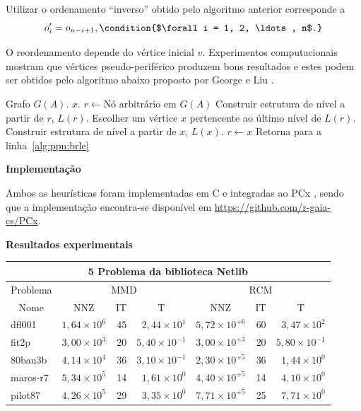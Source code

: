 \documentclass[]{beamer}
\begin{document}
\begin{frame}[t,fragile]
\begin{columns}[t]
\begin{column}{0.4\textwidth}
  Utilizar o ordenamento ``inverso'' obtido pelo algoritmo anterior corresponde
  a
  \begin{dmath*}
    o_i' = o_{n - i + 1}, \condition{$\forall i = 1, 2, \ldots, n$.}
  \end{dmath*}

  O reordenamento depende do vértice inicial $v$. Experimentos computacionais
  mostram que vértices pseudo-periférico produzem bons resultados e estes podem
  ser obtidos pelo algoritmo abaixo proposto por George e Liu
  \cite{George:1979:NodeFinder}.

  \begin{algorithmic}[1]
      \REQUIRE Grafo $G(A)$.
      \ENSURE $x$.
      \STATE $r \longleftarrow \text{Nó arbitrário em }G(A)$
      \STATE Construir estrutura de nível a partir de $r$, $L(r)$.
      \label{alg:ppn:brle}
      \STATE Escolher um vértice $x$ pertencente ao último nível de
      $L(r)$.
      \STATE Construir estrutura de nível a partir de $x$, $L(x)$.
          \STATE $r \longleftarrow x$
          \STATE Retorna para a linha~\ref{alg:ppn:brle}
      \ENDIF
  \end{algorithmic}

  \textbf{Implementação}

  Ambos as heurísticas foram implementadas em C e integradas ao PCx \cite{PCx},
  sendo que a implementação encontra-se disponível em
  \url{https://github.com/r-gaia-cs/PCx}.

  \textbf{Resultados experimentais}
  \begin{center}
\begin{tabular}{|l|r|r|r|r|r|r|}
\hline
\multicolumn{7}{|c|}{5 Problema da biblioteca Netlib} \\ \hline
\multicolumn{1}{|c|}{Problema} & \multicolumn{3}{|c|}{MMD} &         \multicolumn{3}{|c|}{RCM} \\ \hline
\multicolumn{1}{|c|}{Nome} &
        \multicolumn{1}{|c|}{NNZ} & \multicolumn{1}{|c|}{IT} &
        \multicolumn{1}{|c|}{T} &
        \multicolumn{1}{|c|}{NNZ} & \multicolumn{1}{|c|}{IT} &
        \multicolumn{1}{|c|}{T} \\ \hline
        dfl001       & $1,64 \times 10^{6}$ & 45 & $2,44 \times 10^{1}$  & $5,72 \times 10^{+6}$ & 60 & $3,47 \times 10^{2}$ \\ \hline
        fit2p        & $3,00 \times 10^{3}$ & 20 & $5,40 \times 10^{-1}$ & $3,00 \times 10^{+3}$ & 20 & $5,80 \times 10^{-1}$ \\ \hline
        80bau3b      & $4,14 \times 10^{4}$ & 36 & $3,10 \times 10^{-1}$ & $2,30 \times 10^{+5}$ & 36 & $1,44 \times 10^{0}$ \\ \hline
        maros-r7     & $5,34 \times 10^{5}$ & 14 & $1,61 \times 10^{0}$  & $4,40 \times 10^{+5}$ & 14 & $4,10 \times 10^{0}$ \\ \hline
        pilot87      & $4,26 \times 10^{5}$ & 29 & $3,35 \times 10^{0}$  & $7,71 \times 10^{+5}$ & 25 & $7,71 \times 10^{0}$ \\ \hline
\end{tabular}
  \end{center}


\end{column}
\end{columns}
\end{frame}
\end{document}
